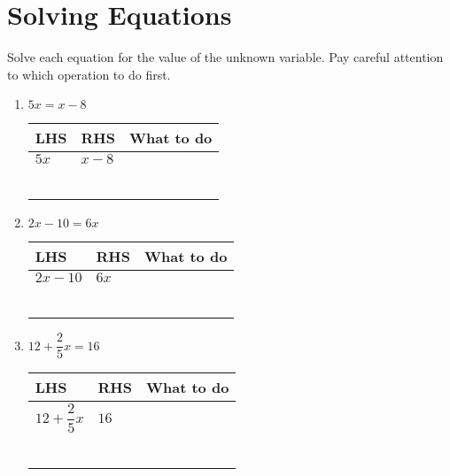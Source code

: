 \documentclass[12pt,letterpaper]{article}
\begin{document}
\pagebreak

\section*{Solving Equations}
\begin{large}
{Solve each equation for the value of the unknown variable. Pay careful attention to which operation to do first.}

\begin{enumerate}
\item \quad $5x = x - 8$

\begin{tabular}{p{}|p{}|p{}}
LHS & RHS & What to do \\
\hline
$5x$ & $x - 8$ & \\
& & \\
& & \\
& & \\
& & \\
& & \\
& & \\
\end{tabular}

\addvspace{0.3in}

\item \quad $2x - 10 = 6x$

\begin{tabular}{p{}|p{}|p{}}
LHS & RHS & What to do \\
\hline
$2x - 10$ & $6x$ & \\
& & \\
& & \\
& & \\
& & \\
& & \\
& & \\
\end{tabular}

\addvspace{0.3in}

\item \quad $12 + \dfrac{2}{5}x = 16$

\begin{tabular}{p{}|p{}|p{}}
LHS & RHS & What to do \\
\hline
$12 + \dfrac{2}{5}x$ & $16$ & \\
& & \\
& & \\
& & \\
& & \\
& & \\
& & \\
\end{tabular}

\addvspace{0.3in}
\end{enumerate}

\end{large}
\end{document}
